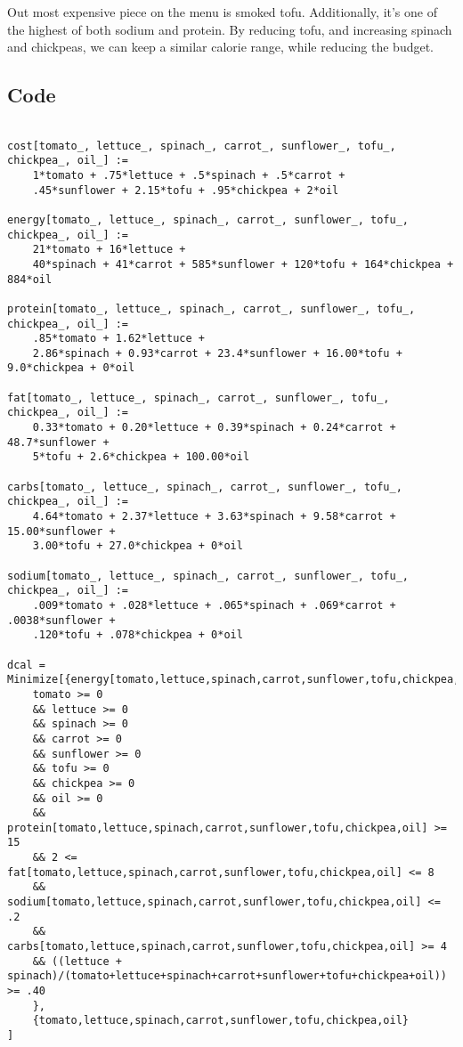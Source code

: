 Out most expensive piece on the menu is smoked tofu.  Additionally, it's one of the highest of both sodium and protein.  By reducing tofu, and increasing spinach and chickpeas, we can keep a similar calorie range, while reducing the budget.

\clearpage

\subsection*{Code}
\begin{verbatim}

cost[tomato_, lettuce_, spinach_, carrot_, sunflower_, tofu_, chickpea_, oil_] := 
	1*tomato + .75*lettuce + .5*spinach + .5*carrot + 
	.45*sunflower + 2.15*tofu + .95*chickpea + 2*oil

energy[tomato_, lettuce_, spinach_, carrot_, sunflower_, tofu_, chickpea_, oil_] := 
	21*tomato + 16*lettuce +
	40*spinach + 41*carrot + 585*sunflower + 120*tofu + 164*chickpea + 884*oil

protein[tomato_, lettuce_, spinach_, carrot_, sunflower_, tofu_, chickpea_, oil_] := 
	.85*tomato + 1.62*lettuce +
	2.86*spinach + 0.93*carrot + 23.4*sunflower + 16.00*tofu + 9.0*chickpea + 0*oil

fat[tomato_, lettuce_, spinach_, carrot_, sunflower_, tofu_, chickpea_, oil_] := 
	0.33*tomato + 0.20*lettuce + 0.39*spinach + 0.24*carrot + 48.7*sunflower + 
	5*tofu + 2.6*chickpea + 100.00*oil

carbs[tomato_, lettuce_, spinach_, carrot_, sunflower_, tofu_, chickpea_, oil_] := 
	4.64*tomato + 2.37*lettuce + 3.63*spinach + 9.58*carrot + 15.00*sunflower + 
	3.00*tofu + 27.0*chickpea + 0*oil

sodium[tomato_, lettuce_, spinach_, carrot_, sunflower_, tofu_, chickpea_, oil_] := 
	.009*tomato + .028*lettuce + .065*spinach + .069*carrot + .0038*sunflower + 
	.120*tofu + .078*chickpea + 0*oil

dcal = Minimize[{energy[tomato,lettuce,spinach,carrot,sunflower,tofu,chickpea,oil],
    tomato >= 0
    && lettuce >= 0
    && spinach >= 0
    && carrot >= 0
    && sunflower >= 0
    && tofu >= 0
    && chickpea >= 0
    && oil >= 0
    && protein[tomato,lettuce,spinach,carrot,sunflower,tofu,chickpea,oil] >= 15
    && 2 <= fat[tomato,lettuce,spinach,carrot,sunflower,tofu,chickpea,oil] <= 8
    && sodium[tomato,lettuce,spinach,carrot,sunflower,tofu,chickpea,oil] <= .2
    && carbs[tomato,lettuce,spinach,carrot,sunflower,tofu,chickpea,oil] >= 4
    && ((lettuce + spinach)/(tomato+lettuce+spinach+carrot+sunflower+tofu+chickpea+oil)) >= .40
    },
    {tomato,lettuce,spinach,carrot,sunflower,tofu,chickpea,oil}
]


\end{verbatim}
